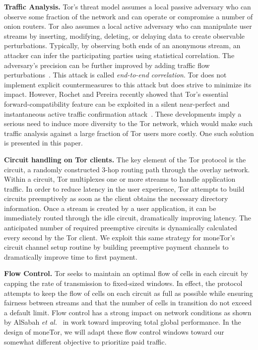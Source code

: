 \textbf{Traffic Analysis.}
Tor's threat model assumes a local passive adversary who can observe some fraction of the network and can operate or compromise a number of onion routers.
Tor also assumes a local active adversary who can manipulate user streams by inserting, modifying, deleting, or delaying data to create observable perturbations.
Typically, by observing both ends of an anonymous stream, an attacker can infer the participating parties using statistical correlation.
The adversary's precision can be further improved by adding traffic flow perturbations~\cite{fu2009one}.
This attack is called \textit{end-to-end correlation}.
Tor does not implement explicit countermeasures to this attack but does strive to minimize its impact.
However, Rochet and Pereira recently showed that Tor's essential forward-compatibility feature can be exploited in a silent near-perfect and instantaneous active traffic confirmation attack~\cite{rochet2018dropping}.
These developments imply a serious need to induce more diversity to the Tor network, which would make such traffic analysis against a large fraction of Tor users more costly.
One such solution is presented in this paper.

\medskip \noindent \textbf{Circuit handling on Tor clients.}
The key element of the Tor protocol is the circuit, a randomly constructed 3-hop routing path through the overlay network.
Within a circuit, Tor multiplexes one or more streams to handle application traffic.
In order to reduce latency in the user experience, Tor attempts to build circuits preemptively as soon as the client obtains the necessary directory information.
Once a stream is created by a user application, it can be immediately routed through the idle circuit, dramatically improving latency.
The anticipated number of required preemptive circuits is dynamically calculated every second by the Tor client.
We exploit this same strategy for moneTor's circuit channel setup routine by building preemptive payment channels to dramatically improve time to first payment.

\medskip \noindent\textbf{Flow Control.}
Tor seeks to maintain an optimal flow of cells in each circuit by capping the rate of transmission to fixed-sized windows.
In effect, the protocol attempts to keep the flow of cells on each circuit as full as possible while ensuring fairness between streams and that the number of cells in transition do not exceed a default limit.
Flow control has a strong impact on network conditions as shown by AlSabah \textit{et al.}~\cite{pets2011-defenestrator} in work toward improving total global performance.
In the design of moneTor, we will adapt these flow control windows toward our somewhat different objective to prioritize paid traffic.

